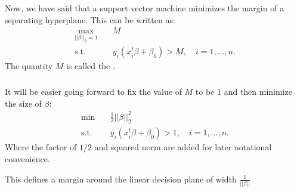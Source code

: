 \documentclass[xetex,mathserif,serif,aspectratio=169]{beamer}
\begin{document}
\begin{frame}[fragile] \frametitle{} \oldB \small

Now, we have said that a support vector machine minimizes the margin
of a separating hyperplane. This can be written as:
\begin{align*}
\max_{|| \beta ||_2 = 1} \quad &  M \\
\text{s.t.} \quad & y_i (x_i^t \beta + \beta_0) > M, \quad i = 1, \ldots, n.
\end{align*}
The quantity $M$ is called the .

\end{frame}

\begin{frame}[fragile] \frametitle{} \oldB \small

It will be easier going forward to fix the value of $M$ to be $1$ and then
minimize the size of $\beta$:
\begin{align*}
\min \quad &  \frac{1}{2} || \beta ||_2^2 \\
\text{s.t.} \quad & y_i (x_i^t \beta + \beta_0) > 1, \quad i = 1, \ldots, n.
\end{align*}
Where the factor of $1/2$ and squared norm are added for later
notational convenience.

This defines a margin around the linear decision plane of width
$\frac{1}{|| \beta ||}$

\end{frame}
\end{document}
